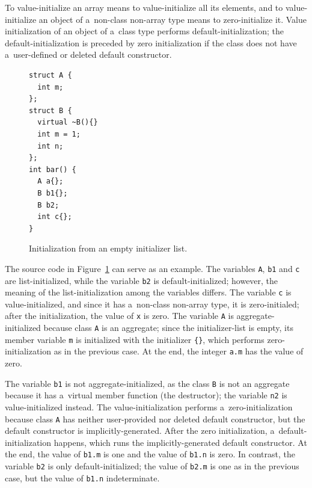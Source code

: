 \documentclass[nolot,nolof,nocover,printed]{fithesis3}
\begin{document}
To value-initialize an array means to value-initialize all its elements, and to value-initialize an object of a~non-class non-array type means to zero-initialize it. Value initialization of an object of a~class type performs default-initialization; the default-initialization is preceded by zero initialization if the class does not have a~user-defined or deleted default constructor.

\begin{figure}
\begin{lstlisting}
struct A {
  int m;
};
struct B {
  virtual ~B(){}
  int m = 1;
  int n;
};
int bar() {
  A a{};
  B b1{};
  B b2;
  int c{};
}
\end{lstlisting}
\caption{Initialization from an empty initializer list.}
\label{fig:valueInit}
\end{figure}

The source code in Figure~\ref{fig:valueInit} can serve as an example. The variables \lstinline|A|, \lstinline|b1| and \lstinline|c| are list-initialized, while the variable \lstinline|b2| is default-initialized; however, the meaning of the list-initialization among the variables differs. The variable \lstinline|c| is value-initialized, and since it has a~non-class non-array type, it is zero-initialed; after the initialization, the value of \lstinline|x| is zero. The variable \lstinline|A| is aggregate-initialized because class \lstinline|A| is an aggregate; since the initializer-list is empty, its member variable \lstinline|m| is initialized with the initializer \lstinline|{}|, which performs zero-initialization as in the previous case. At the end, the integer \lstinline|a.m| has the value of zero.

The variable \lstinline|b1| is not aggregate-initialized, as the class \lstinline|B| is not an aggregate because it has a~virtual member function (the destructor); the variable \lstinline|n2| is value-initialized instead. The value-initialization performs a~zero-initialization because class \lstinline|A| has neither user-provided nor deleted default constructor, but the default constructor is implicitly-generated. After the zero initialization, a~default-initialization happens, which runs the implicitly-generated default constructor. At the end, the value of \lstinline|b1.m| is one and the value of \lstinline|b1.n| is zero.
In contrast, the variable \lstinline|b2| is only default-initialized; the value of \lstinline|b2.m| is one as in the previous case, but the value of \lstinline|b1.n| indeterminate.
\end{document}
